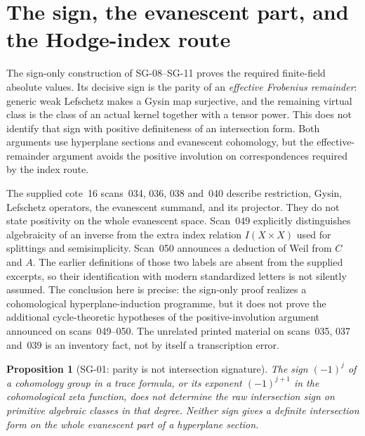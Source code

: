 \documentclass[11pt,a4paper]{article}
\newtheorem{proposition}[theorem]{Proposition}
\theoremstyle{remark}
\begin{document}
\section{The sign, the evanescent part, and the Hodge-index route}

The sign-only construction of SG-08--SG-11 proves the required finite-field absolute values. Its decisive sign is the parity of an \emph{effective Frobenius remainder}: generic weak Lefschetz makes a Gysin map surjective, and the remaining virtual class is the class of an actual kernel together with a tensor power. This does not identify that sign with positive definiteness of an intersection form. Both arguments use hyperplane sections and evanescent cohomology, but the effective-remainder argument avoids the positive involution on correspondences required by the index route.

The supplied cote~16 scans~034, 036, 038 and~040 describe restriction, Gysin, Lefschetz operators, the evanescent summand, and its projector. They do not state positivity on the whole evanescent space. Scan~049 explicitly distinguishes algebraicity of an inverse from the extra index relation $I(X\times X)$ used for splittings and semisimplicity. Scan~050 announces a deduction of Weil from $C$ and $A$. The earlier definitions of those two labels are absent from the supplied excerpts, so their identification with modern standardized letters is not silently assumed. The conclusion here is precise: the sign-only proof realizes a cohomological hyperplane-induction programme, but it does not prove the additional cycle-theoretic hypotheses of the positive-involution argument announced on scans~049--050. The unrelated printed material on scans~035, 037 and~039 is an inventory fact, not by itself a transcription error.

\begin{proposition}[SG-01: parity is not intersection signature]
The sign $(-1)^j$ of a cohomology group in a trace formula, or its exponent $(-1)^{j+1}$ in the cohomological zeta function, does not determine the raw intersection sign on primitive algebraic classes in that degree. Neither sign gives a definite intersection form on the whole evanescent part of a hyperplane section.
\end{proposition}
\end{document}
